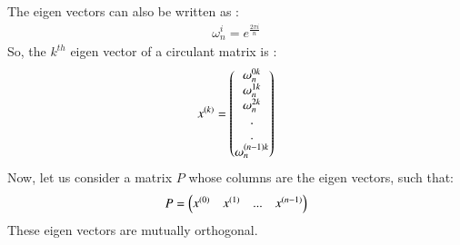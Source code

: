 \documentclass[journal,12pt,twocolumn]{IEEEtran}
\begin{document}
The eigen vectors can also be written as :
\begin{align}
\omega_n^{i} = e^{\frac{2\pi i}{n}}
\end{align}
So, the $k^{th}$ eigen vector of a circulant matrix is :
\begin{align}
x^{(k)} = \begin{pmatrix}\omega_n^{0k}\\\omega_n^{1k}\\\omega_n^{2k}\\.\\.\\\omega_n^{(n-1)k}\end{pmatrix}
\end{align}
Now, let us consider a matrix $P$ whose columns are the eigen vectors, such that:
\begin{align}
P = \begin{pmatrix}x^{(0)} & x^{(1)} &...&x^{(n-1)}\end{pmatrix}
\end{align}
These eigen vectors are mutually orthogonal.
\end{document}
